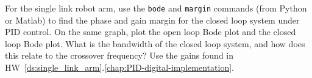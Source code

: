 
For the single link robot arm, use the \texttt{bode} and \texttt{margin} commands (from Python or Matlab) to find the phase and gain margin for the closed loop system under PID control.  On the same graph, plot the open loop Bode plot and the closed loop Bode plot.  What is the bandwidth of the closed loop system, and how does this relate to the crossover frequency?  Use the gains found in HW~\ref{ds:single_link_arm}.\ref{chap:PID-digital-implementation}.
